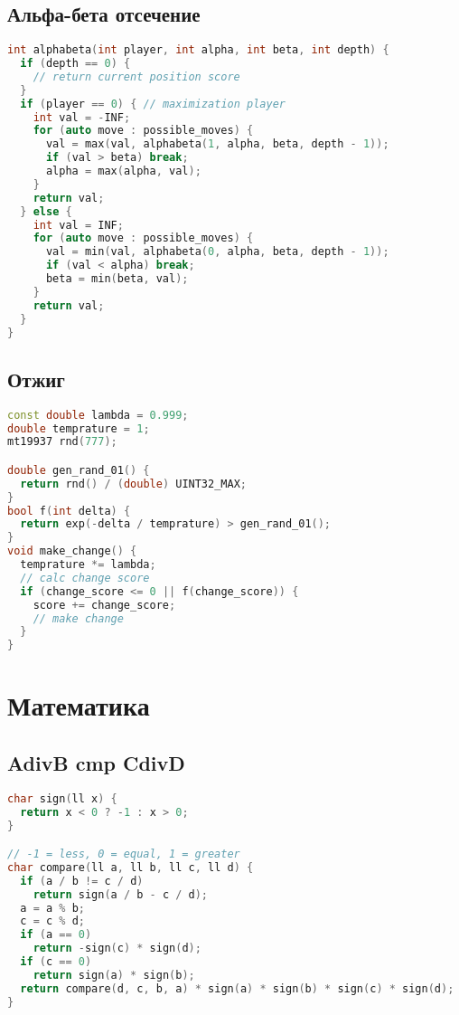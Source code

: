 \documentclass[9pt,a4paper,landscape,twosided]{extarticle}
\begin{document}
\begin{multicols*}{3}
\subsection{Альфа-бета отсечение}
\begin{lstlisting}[language=C++]
int alphabeta(int player, int alpha, int beta, int depth) {
  if (depth == 0) {
    // return current position score
  }
  if (player == 0) { // maximization player
    int val = -INF;
    for (auto move : possible_moves) {
      val = max(val, alphabeta(1, alpha, beta, depth - 1));
      if (val > beta) break;
      alpha = max(alpha, val);
    }
    return val;
  } else {
    int val = INF;
    for (auto move : possible_moves) {
      val = min(val, alphabeta(0, alpha, beta, depth - 1));
      if (val < alpha) break;
      beta = min(beta, val);
    }
    return val;
  }
}
\end{lstlisting}

\subsection{Отжиг}
\begin{lstlisting}[language=C++]
const double lambda = 0.999;
double temprature = 1;
mt19937 rnd(777);

double gen_rand_01() {
  return rnd() / (double) UINT32_MAX;
}
bool f(int delta) {
  return exp(-delta / temprature) > gen_rand_01();
}
void make_change() {
  temprature *= lambda;
  // calc change score
  if (change_score <= 0 || f(change_score)) {
    score += change_score;
    // make change
  }
}
\end{lstlisting}

\section{Математика}

\subsection{AdivB cmp CdivD}
\begin{lstlisting}[language=C++]
char sign(ll x) {
  return x < 0 ? -1 : x > 0;
}

// -1 = less, 0 = equal, 1 = greater
char compare(ll a, ll b, ll c, ll d) {
  if (a / b != c / d)
    return sign(a / b - c / d);
  a = a % b;
  c = c % d;
  if (a == 0)
    return -sign(c) * sign(d);
  if (c == 0)
    return sign(a) * sign(b);
  return compare(d, c, b, a) * sign(a) * sign(b) * sign(c) * sign(d);
}


\end{lstlisting}
\end{multicols*}
\end{document}
